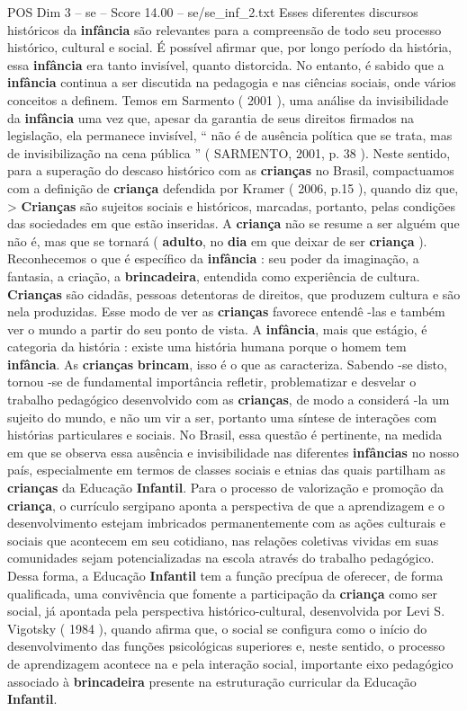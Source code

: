 \begin{textsample}{POS Dim 3 – se – Score 14.00 – se/se\_inf\_2.txt}
Esses diferentes discursos históricos da \textbf{infância} são relevantes para a compreensão de todo seu processo histórico, cultural e social.
É possível afirmar que, por longo período da história, essa \textbf{infância} era tanto invisível, quanto distorcida.
No entanto, é sabido que a \textbf{infância} continua a ser discutida na pedagogia e nas ciências sociais, onde vários conceitos a definem.
Temos em Sarmento ( 2001 ), uma análise da invisibilidade da \textbf{infância} uma vez que, apesar da garantia de seus direitos firmados na legislação, ela permanece invisível, “ não é de ausência política que se trata, mas de invisibilização na cena pública ” ( SARMENTO, 2001, p. 38 ).
Neste sentido, para a superação do descaso histórico com as \textbf{crianças} no Brasil, compactuamos com a definição de \textbf{criança} defendida por Kramer ( 2006, p.15 ), quando diz que, > \textbf{Crianças} são sujeitos sociais e históricos, marcadas, portanto, pelas condições das sociedades em que estão inseridas.
A \textbf{criança} não se resume a ser alguém que não é, mas que se tornará ( \textbf{adulto}, no \textbf{dia} em que deixar de ser \textbf{criança} ).
Reconhecemos o que é específico da \textbf{infância} : seu poder da imaginação, a fantasia, a criação, a \textbf{brincadeira}, entendida como experiência de cultura. \textbf{Crianças} são cidadãs, pessoas detentoras de direitos, que produzem cultura e são nela produzidas.
Esse modo de ver as \textbf{crianças} favorece entendê -las e também ver o mundo a partir do seu ponto de vista.
A \textbf{infância}, mais que estágio, é categoria da história : existe uma história humana porque o homem tem \textbf{infância}.
As \textbf{crianças} \textbf{brincam}, isso é o que as caracteriza.
Sabendo -se disto, tornou -se de fundamental importância refletir, problematizar e desvelar o trabalho pedagógico desenvolvido com as \textbf{crianças}, de modo a considerá -la um sujeito do mundo, e não um vir a ser, portanto uma síntese de interações com histórias particulares e sociais.
No Brasil, essa questão é pertinente, na medida em que se observa essa ausência e invisibilidade nas diferentes \textbf{infâncias} no nosso país, especialmente em termos de classes sociais e etnias das quais partilham as \textbf{crianças} da Educação \textbf{Infantil}.
Para o processo de valorização e promoção da \textbf{criança}, o currículo sergipano aponta a perspectiva de que a aprendizagem e o desenvolvimento estejam imbricados permanentemente com as ações culturais e sociais que acontecem em seu cotidiano, nas relações coletivas vividas em suas comunidades sejam potencializadas na escola através do trabalho pedagógico.
Dessa forma, a Educação \textbf{Infantil} tem a função precípua de oferecer, de forma qualificada, uma convivência que fomente a participação da \textbf{criança} como ser social, já apontada pela perspectiva histórico-cultural, desenvolvida por Levi S.
Vigotsky ( 1984 ), quando afirma que, o social se configura como o início do desenvolvimento das funções psicológicas superiores e, neste sentido, o processo de aprendizagem acontece na e pela interação social, importante eixo pedagógico associado à \textbf{brincadeira} presente na estruturação curricular da Educação \textbf{Infantil}.


\end{textsample}
